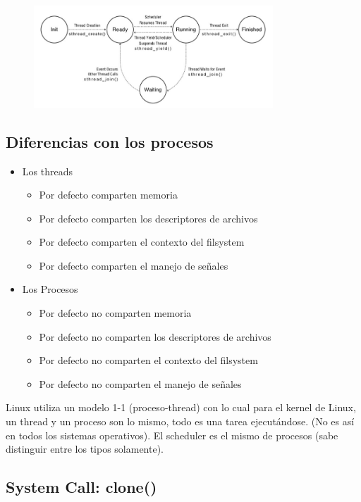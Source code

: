 \documentclass[titlepage,a4paper]{article}
\begin{document}
\begin{figure}[!htb]
    \centering
    \includegraphics[width=0.8\textwidth]{ImagenesApunte/threads_estados_ejecucion.jpg}
\end{figure}

\subsection*{Diferencias con los procesos}
\begin{itemize}
    \item Los threads
        \begin{itemize}
        \item Por defecto comparten memoria
        \item Por defecto comparten los descriptores de archivos
        \item Por defecto comparten el contexto del filsystem
        \item Por defecto comparten el manejo de señales
        \end{itemize}
    \item Los Procesos
        \begin{itemize}
        \item Por defecto no comparten memoria
        \item Por defecto no comparten los descriptores de archivos
        \item Por defecto no comparten el contexto del filsystem
        \item Por defecto no comparten el manejo de señales
        \end{itemize}
\end{itemize}

Linux utiliza un modelo 1-1 (proceso-thread) con lo cual para el kernel de Linux, un thread y un proceso son lo mismo, todo es una tarea ejecutándose. (No es así en todos los sistemas operativos). El scheduler es el mismo de procesos (sabe distinguir entre los tipos solamente).

\subsection*{System Call: clone()}
\end{document}
